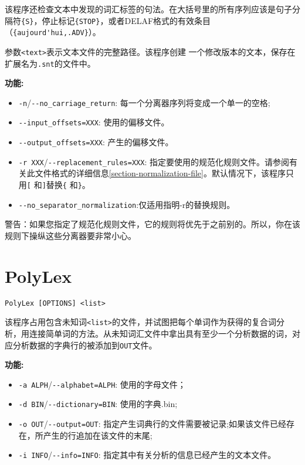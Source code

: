 \bigskip
\noindent 该程序还检查文本中发现的词汇标签的句法。在大括号里的所有序列应该是句子分隔符\verb+{S}+，停止标记\verb+{STOP}+，或者DELAF格式的有效条目（\verb+{aujourd'hui,.ADV}+）。


\bigskip
\noindent {} 参数\verb+<text>+表示文本文件的完整路径。该程序创建
一个修改版本的文本，保存在扩展名为\verb+.snt+的文件中。

\bigskip
\noindent \textbf{功能:}
\begin{itemize}
\item \verb+-n+/\verb+--no_carriage_return+: 每一个分离器序列将变成一个单一的空格;
\item \verb+--input_offsets=XXX+: 使用的偏移文件。
\item \verb+--output_offsets=XXX+: 产生的偏移文件。
\item \verb+-r XXX+/\verb+--replacement_rules=XXX+:
指定要使用的规范化规则文件。请参阅有关此文件格式的详细信息\ref{section-normalization-file}。默认情况下，该程序只用\verb+[+ 和\verb+]+替换\verb+{+ 和\verb+}+。
\item \verb+--no_separator_normalization+:仅适用指明-r的替换规则。
\end{itemize}

\bigskip
\noindent 警告：如果您指定了规范化规则文件，它的规则将优先于之前别的。所以，你在该规则下操纵这些分离器要非常小心。





\section{PolyLex}
\verb+PolyLex [OPTIONS] <list>+

\bigskip
\noindent 该程序占用包含未知词\verb+<list>+的文件，并试图把每个单词作为获得的复合词分析，用连接简单词的方法。从未知词汇文件中拿出具有至少一个分析数据的词，对应分析数据的字典行的被添加到\verb+OUT+文件。

\bigskip
\noindent \textbf{功能:}
\begin{itemize}
  \item \verb+-a ALPH+/\verb+--alphabet=ALPH+: 使用的字母文件；

  \item \verb+-d BIN+/\verb+--dictionary=BIN+: 使用的字典.bin;

  \item \verb+-o OUT+/\verb+--output=OUT+: 指定产生词典行的文件需要被记录;如果该文件已经存在，所产生的行追加在该文件的末尾;
  \item \verb+-i INFO+/\verb+--info=INFO+: 指定其中有关分析的信息已经产生的文本文件。
\end{itemize}

